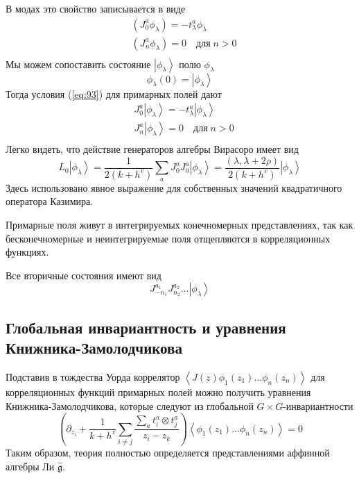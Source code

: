 \documentclass[a4paper,12pt]{article}
\theoremstyle{definition} \newtheorem{Def}{Definition}
\begin{document}
В модах это свойство записывается в виде
\begin{equation}
  \label{eq:93}
  \begin{aligned}
    & (J_0^a \phi_{\lambda})=-t^a_{\lambda}\phi_{\lambda}\\
    & (J^a_n\phi_{\lambda})=0\quad \mbox{для}\; n>0\\
  \end{aligned}
\end{equation}
Мы можем сопоставить состояние $\left|\phi_{\lambda}\right>$ полю $\phi_{\lambda}$
  \begin{equation}
    \label{eq:94}
    \phi_{\lambda}(0)=\left|\phi_{\lambda}\right>
  \end{equation}
Тогда условия (\ref{eq:93}) для примарных полей дают
\begin{equation}
  \label{eq:95}
  \begin{aligned}
    & J_0^a\left|\phi_{\lambda}\right>=-t^a_{\lambda}\left|\phi_{\lambda}\right>\\
    & J^a_n\left|\phi_{\lambda}\right>=0 \quad \mbox{для}\; n>0 \\
  \end{aligned}
\end{equation}
Легко видеть, что действие генераторов алгебры Вирасоро имеет вид
\begin{equation}
  \label{eq:96}
  L_0\left|\phi_{\lambda}\right>=\frac{1}{2(k+h^v)}\sum_aJ^a_0J^a_0\left|\phi_{\lambda}\right>=\frac{(\lambda,\lambda+2\rho)}{2(k+h^v)}\left|\phi_{\lambda}\right>
\end{equation}
Здесь использовано явное выражение для собственных значений квадратичного оператора Казимира.

Примарные поля живут в интегрируемых конечномерных представлениях, так как бесконечномерные и неинтегрируемые поля отщепляются в корреляционных функциях.

Все вторичные состояния имеют вид
\begin{equation}
  \label{eq:97}
  J^{a_1}_{-n_1}J^{a_2}_{n_2}\dots\left|\phi_{\lambda}\right>
\end{equation}
\subsection{Глобальная инвариантность и уравнения Книжника-Замолодчикова}
\label{sec:knizhnik-zamolodchikov}
Подставив в тождества Уорда коррелятор $\left<J(z)\phi_1(z_1)\dots \phi_n(z_n)\right>$ 
для корреляционных функций примарных полей можно получить уравнения Книжника-Замолодчикова, которые следуют из глобальной $G\times G$-инвариантности
\begin{equation}
  \label{eq:98}
  \left(\partial_{z_i}+\frac{1}{k+h^v}\sum_{i\neq j}\frac{\sum_a t^a_i\otimes t^a_j}{z_i-z_k}\right)
  \left<\phi_1(z_1)\dots \phi_n(z_n)\right>=0
\end{equation}
Таким образом, теория полностью определяется представлениями аффинной алгебры Ли $\hat{\mathfrak{g}} $.
\end{document}
